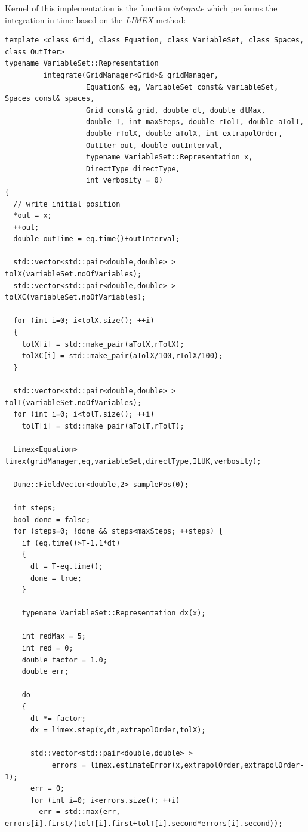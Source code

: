\documentclass[11pt]{article}
\begin{document}
Kernel of this implementation is the function {\em integrate} which performs
the integration in time based on the {\em LIMEX} method:

\begin{lstlisting}
template <class Grid, class Equation, class VariableSet, class Spaces, class OutIter>
typename VariableSet::Representation  
         integrate(GridManager<Grid>& gridManager,
                   Equation& eq, VariableSet const& variableSet, Spaces const& spaces,
                   Grid const& grid, double dt, double dtMax,
                   double T, int maxSteps, double rTolT, double aTolT,
                   double rTolX, double aTolX, int extrapolOrder, 
                   OutIter out, double outInterval,
                   typename VariableSet::Representation x,
                   DirectType directType,
                   int verbosity = 0)
{
  // write initial position
  *out = x;
  ++out;
  double outTime = eq.time()+outInterval;
  
  std::vector<std::pair<double,double> > tolX(variableSet.noOfVariables);
  std::vector<std::pair<double,double> > tolXC(variableSet.noOfVariables);

  for (int i=0; i<tolX.size(); ++i) 
  {
    tolX[i] = std::make_pair(aTolX,rTolX);
    tolXC[i] = std::make_pair(aTolX/100,rTolX/100);
  }
  
  std::vector<std::pair<double,double> > tolT(variableSet.noOfVariables);
  for (int i=0; i<tolT.size(); ++i)
    tolT[i] = std::make_pair(aTolT,rTolT);
  
  Limex<Equation> limex(gridManager,eq,variableSet,directType,ILUK,verbosity);

  Dune::FieldVector<double,2> samplePos(0);

  int steps;
  bool done = false;
  for (steps=0; !done && steps<maxSteps; ++steps) {
    if (eq.time()>T-1.1*dt) 
    {
      dt = T-eq.time();
      done = true;
    }
    
    typename VariableSet::Representation dx(x);

    int redMax = 5;
    int red = 0;
    double factor = 1.0;
    double err;
    
    do 
    {
      dt *= factor;
      dx = limex.step(x,dt,extrapolOrder,tolX);

      std::vector<std::pair<double,double> > 
           errors = limex.estimateError(x,extrapolOrder,extrapolOrder-1);
      err = 0;
      for (int i=0; i<errors.size(); ++i)
        err = std::max(err, errors[i].first/(tolT[i].first+tolT[i].second*errors[i].second));
      

\end{lstlisting}
\end{document}

